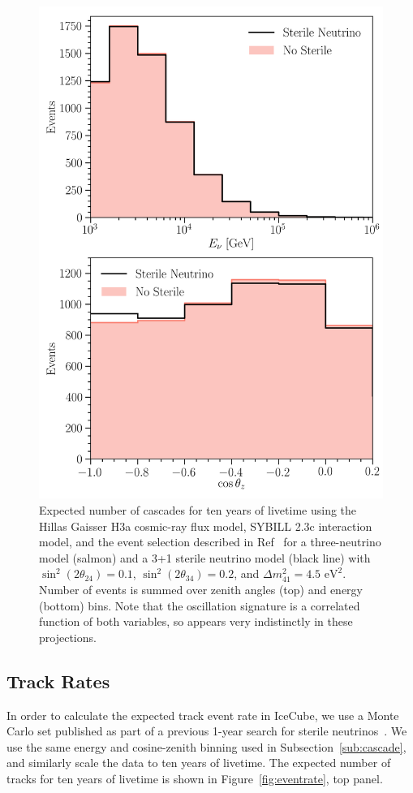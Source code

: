 \documentclass[main.tex]{subfiles}
\begin{document}
\begin{figure}
    \centering
    \includegraphics[width=0.95\linewidth]{figures/bothflat.png}
    \caption{Expected number of cascades for ten years of livetime using the Hillas Gaisser H3a cosmic-ray flux model, SYBILL 2.3c interaction model, and the event selection described in Ref~\cite{2018PhDT17N} for a three-neutrino model (salmon) and a 3+1 sterile neutrino model (black line) with $\sin^{2}(2\theta_{24})=0.1$, $\sin^{2}(2\theta_{34})=0.2$, and $\Delta m_{41}^{2}=4.5\text{ eV}^{2}$. Number of events is summed over zenith angles (top) and energy (bottom) bins.  Note that the oscillation signature is a correlated function of both variables, so appears very indistinctly in these projections.}\label{fig:flat}
\end{figure}


\subsection{Track Rates}
In order to calculate the expected track event rate in IceCube, we use a Monte Carlo set published as part of a previous 1-year search for sterile neutrinos~\cite{PhysRevLett.117.071801}. 
We use the same energy and cosine-zenith binning used in Subsection~\ref{sub:cascade}, and similarly scale the data to ten years of livetime. 
The expected number of tracks for ten years of livetime is shown in Figure~\ref{fig:eventrate}, top panel. 
\end{document}
